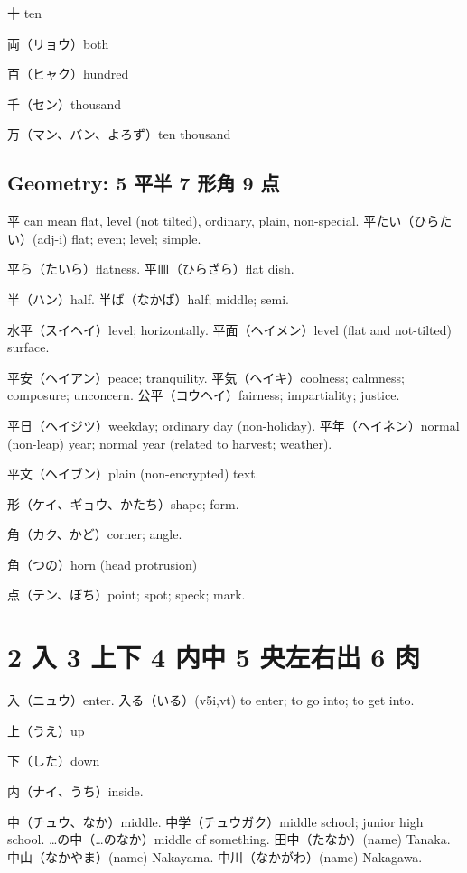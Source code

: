 十 ten

両（リョウ）both

百（ヒャク）hundred

千（セン）thousand

万（マン、バン、よろず）ten thousand

\subsection{Geometry: 5 平半 7 形角 9 点}

平 can mean flat, level (not tilted), ordinary, plain, non-special.
平たい（ひらたい）(adj-i) flat; even; level; simple.

平ら（たいら）flatness.
平皿（ひらざら）flat dish.

半（ハン）half.
半ば（なかば）half; middle; semi.

水平（スイヘイ）level; horizontally.
平面（ヘイメン）level (flat and not-tilted) surface.

平安（ヘイアン）peace; tranquility.
平気（ヘイキ）coolness; calmness; composure; unconcern.
公平（コウヘイ）fairness; impartiality; justice.

平日（ヘイジツ）weekday; ordinary day (non-holiday).
平年（ヘイネン）normal (non-leap) year; normal year (related to harvest; weather).

平文（ヘイブン）plain (non-encrypted) text.

形（ケイ、ギョウ、かたち）shape; form.

角（カク、かど）corner; angle.

角（つの）horn (head protrusion)

点（テン、ぼち）point; spot; speck; mark.



\section{2 入 3 上下 4 内中 5 央左右出 6 肉}

入（ニュウ）enter.
入る（いる）(v5i,vt)
to enter; to go into; to get into.

上（うえ）up

下（した）down

内（ナイ、うち）inside.

中（チュウ、なか）middle.
中学（チュウガク）middle school; junior high school.
…の中（…のなか）middle of something.
田中（たなか）(name) Tanaka.
中山（なかやま）(name) Nakayama.
中川（なかがわ）(name) Nakagawa.

